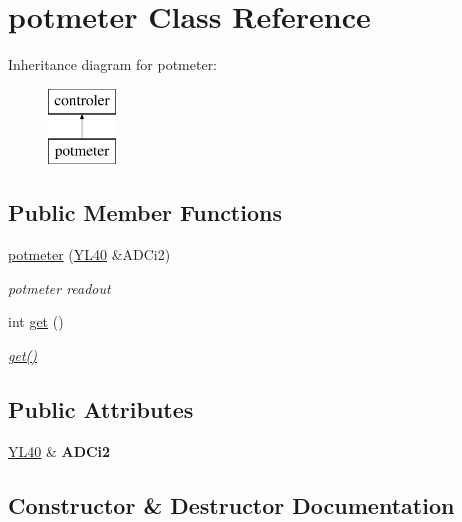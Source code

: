 \hypertarget{classpotmeter}{}\section{potmeter Class Reference}
\label{classpotmeter}
Inheritance diagram for potmeter\+:\begin{figure}[H]
\begin{center}
\leavevmode
\includegraphics[height=2.000000cm]{classpotmeter}
\end{center}
\end{figure}
\subsection*{Public Member Functions}
\begin{DoxyCompactItemize}
\item 
\mbox{\hyperlink{classpotmeter_a30949c70814bb0cd26d8bb043529ce59}{potmeter}} (\mbox{\hyperlink{class_y_l40}{Y\+L40}} \&A\+D\+Ci2)
\begin{DoxyCompactList}\small\item\em potmeter readout \end{DoxyCompactList}\item 
int \mbox{\hyperlink{classpotmeter_a9184480674fac846504a03a77036dd71}{get}} ()
\begin{DoxyCompactList}\small\item\em \mbox{\hyperlink{classpotmeter_a9184480674fac846504a03a77036dd71}{get()}} \end{DoxyCompactList}\end{DoxyCompactItemize}
\subsection*{Public Attributes}
\begin{DoxyCompactItemize}
\item 
\mbox{\label{classpotmeter_af61db45fd919db8beabc841c800d3e1c}} 
\mbox{\hyperlink{class_y_l40}{Y\+L40}} \& {\bfseries A\+D\+Ci2}
\end{DoxyCompactItemize}


\subsection{Constructor \& Destructor Documentation}
\mbox{\label{classpotmeter_a30949c70814bb0cd26d8bb043529ce59}} 
